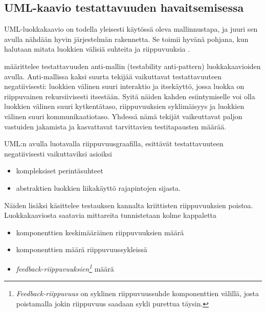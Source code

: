 \documentclass[finnish]{tktltiki2}
\theoremstyle{definition}
\theoremstyle{remark}
\begin{document}
\subsection{UML-kaavio testattavuuden havaitsemisessa}

UML-luokkakaavio on todella yleisesti käytössä oleva mallinnustapa, ja juuri sen avulla nähdään hyvin järjestelmän rakennetta. Se toimii hyvänä pohjana, kun halutaan mitata luokkien välisiä suhteita ja riippuvuuksia \citep{baudry_testability_2002}. 


\citep[s. 3]{baudry_measuring_2003} määrittelee testattavuuden anti-mallin (testability anti-pattern) luokkakaavioiden avulla. Anti-mallissa kaksi suurta tekijää vaikuttavat testattavuuteen negatiivisesti: luokkien välinen suuri interaktio ja itsekäyttö, jossa luokka on riippuvainen rekursiivisesti itsestään. Syitä näiden kahden esiintymiselle voi olla luokkien välinen suuri kytkentätaso, riippuvuuksien syklimäisyys ja luokkien välinen suuri kommunikaatiotaso. Yhdessä nämä tekijät vaikeuttavat paljon vastuiden jakamista ja kasvattavat tarvittavien testitapausten määrää. 


UML:n avulla luotavalla riippuvuusgraafilla, esittävät testattavuuteen negatiivisesti vaikuttaviksi asioiksi \citep{baudry_testability_2002}

\begin{itemize} 
	\item kompleksiset perintäsuhteet
	\item abstraktien luokkien liikakäyttö rajapintojen sijasta.
\end{itemize}


Näiden lisäksi \citep{Jungmayr:2002} käsittelee testauksen kannalta kriittisten riippuvuuksien poistoa. Luokkakaaviosta saatavia mittareita tunnistetaan kolme kappaletta 

\begin{itemize}
	\item komponenttien keskimääräinen riippuvuuksien määrä
	\item komponenttien määrä riippuvuussykleissä
	\item \textit{feedback-riippuvuuksien\footnote{\textit{Feedback-riippuvuus} on syklinen riippuvuussuhde komponenttien välillä, josta poistamalla jokin riippuvuus saadaan sykli purettua täysin.}}  määrä 
\end{itemize}
\end{document}

